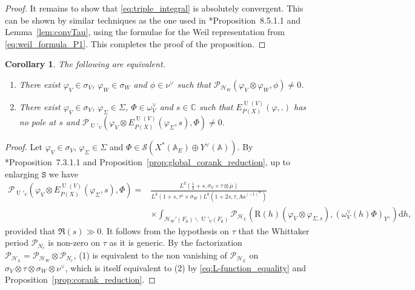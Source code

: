 \documentclass[letterpaper,11pt]{amsart}
\newcommand{\bA}{\mathbb{A}}
\newcommand{\C}{\mathbb{C}}
\newcommand{\cH}{\mathcal{H}}
\newcommand{\cP}{\mathcal{P}}
\newcommand{\cS}{\mathcal{S}}
\newcommand{\rd}{\mathrm{d}}
\newcommand{\sfc}{\mathsf{c}}
\newcommand{\tS}{\mathtt{S}}
\newcommand{\<}{\negthickspace}
\DeclareMathOperator{\U}{U}
\theoremstyle{definition}
\theoremstyle{plain}
\newtheorem{coro}[definition]{Corollary}
\theoremstyle{remark}
\numberwithin{equation}{section}
\begin{document}
\begin{proof}
It remains to show that \eqref{eq:triple_integral} is absolutely convergent. This can be shown by similar techniques as the one used in \cite{BPC22}*{Proposition~8.5.1.1} and Lemma~\ref{lem:convTau}, using the formulae for the Weil representation from \eqref{eq:weil_formula_P1}. This completes the proof of the proposition.
\end{proof}


\begin{coro}
\label{cor:non_vanishing_of_periods}
    The following are equivalent.
    \begin{enumerate}
        \item There exist $\varphi_V \in \sigma_V$, $\varphi_W \in \sigma_W$  and $\phi \in \nu^\vee$ such that $\cP_{\cH_W} \left( \varphi_V \otimes \varphi_W , \phi \right) \neq 0$.
        \item There exist $\varphi_V \in \sigma_V$, $\varphi_\Sigma \in \Sigma$, $\Phi \in \omega^\vee_{V}$ and $s \in \C$ such that $E_{P(X)}^{\U(V)}(\varphi,.)$ has no pole at $s$ and $\cP_{\U'_V}\left( \varphi_V \otimes E_{P(X)}^{\U(V)}(\varphi_\Sigma,s) , \Phi \right) \neq 0$.
    \end{enumerate}
\end{coro}

\begin{proof}
    Let $\varphi_V \in \sigma_V$, $\varphi_\Sigma \in \Sigma$ and $\Phi \in \cS(X^*(\bA_E) \oplus Y^\vee(\bA))$. By \cite{Boi}*{Proposition~7.3.1.1} and Proposition~\ref{prop:global_corank_reduction}, up to enlarging $\tS$ we have 
\begin{align}
\label{eq:L-function_equality}
        \cP_{\U'_V}\left(\varphi_V \otimes E_{P(X)}^{\U(V)}(\varphi_\Sigma,s)  , \Phi \right) =  &\frac{L^{\tS}(\frac{1}{2}+s, \sigma_V \times \tau \otimes \overline{\mu})}{L^{\tS}(1+s,\tau^{\sfc} \times \sigma_W)L^{\tS}(1+2s,\tau,\mathrm{As}^{(-1)^{m}})} \\
        &\times \int_{\cH_W'(F_\tS) \backslash \U'_V(F_\tS)} \cP_{\cH_L} \left( \mathrm{R}(h)(\varphi_V \otimes \varphi_{\Sigma,s} ) , (\omega^\vee_{V}(h) \Phi)_{Y^\vee} \right) \rd h, \nonumber
\end{align}
provided that $\Re(s) \gg 0$. It follows from the hypothesis on $\tau$ that the Whittaker period $\cP_{N_r}$ is non-zero on $\tau$ as it is generic. By the factorization $\cP_{\cH_L}= \cP_{\cH_W} \otimes \cP_{N_r}$, (1) is equivalent to the non vanishing of $\cP_{\cH_L}$ on $\sigma_V  \otimes \tau \otimes \sigma_W \otimes  \nu^\vee$, which is itself equivalent to (2) by \eqref{eq:L-function_equality} and Proposition~\ref{prop:corank_reduction}.
\end{proof}
\end{document}
